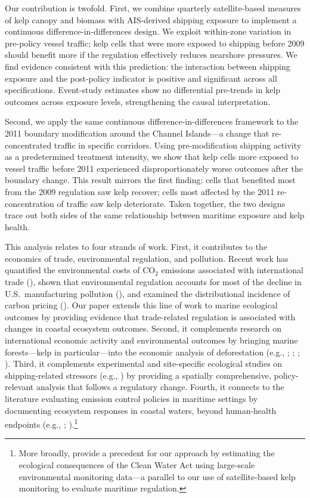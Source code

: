 \documentclass[12pt]{article}
\begin{document}
Our contribution is twofold. First, we combine quarterly satellite-based measures of kelp canopy and biomass with AIS-derived shipping exposure to implement a continuous difference-in-differences design. We exploit within-zone variation in pre-policy vessel traffic; kelp cells that were more exposed to shipping before 2009 should benefit more if the regulation effectively reduces nearshore pressures. We find evidence consistent with this prediction: the interaction between shipping exposure and the post-policy indicator is positive and significant across all specifications. Event-study estimates show no differential pre-trends in kelp outcomes across exposure levels, strengthening the causal interpretation.

Second, we apply the same continuous difference-in-differences framework to the 2011 boundary modification around the Channel Islands---a change that re-concentrated traffic in specific corridors. Using pre-modification shipping activity as a predetermined treatment intensity, we show that kelp cells more exposed to vessel traffic before 2011 experienced disproportionately worse outcomes after the boundary change. This result mirrors the first finding: cells that benefited most from the 2009 regulation saw kelp recover; cells most affected by the 2011 re-concentration of traffic saw kelp deteriorate. Taken together, the two designs trace out both sides of the same relationship between maritime exposure and kelp health.

This analysis relates to four strands of work. First, it contributes to the economics of trade, environmental regulation, and pollution. Recent work has quantified the environmental costs of CO$_2$ emissions associated with international trade (\citealp{Shapiro2016}), shown that environmental regulation accounts for most of the decline in U.S.\ manufacturing pollution (\citealp{ShapiroWalker2018}), and examined the distributional incidence of carbon pricing (\citealp{GraingerKolstad2010}). Our paper extends this line of work to marine ecological outcomes by providing evidence that trade-related regulation is associated with changes in coastal ecosystem outcomes. Second, it complements research on international economic activity and environmental outcomes by bringing marine forests---kelp in particular---into the economic analysis of deforestation (e.g., \citealp{Berman2023}; \citealp{Abman2020}; \citealp{Carreira2024}; \citealp{Nedoncelle2024}). Third, it complements experimental and site-specific ecological studies on shipping-related stressors (e.g., \citealp{Johansson2012}) by providing a spatially comprehensive, policy-relevant analysis that follows a regulatory change. Fourth, it connects to the literature evaluating emission control policies in maritime settings by documenting ecosystem responses in coastal waters, beyond human-health endpoints (e.g., \citealp{Klotz2022}; \citealp{HansenLewis2022}).\footnote{More broadly, \citet{KeiserShapiro2019} provide a precedent for our approach by estimating the ecological consequences of the Clean Water Act using large-scale environmental monitoring data---a parallel to our use of satellite-based kelp monitoring to evaluate maritime regulation.}
\end{document}
